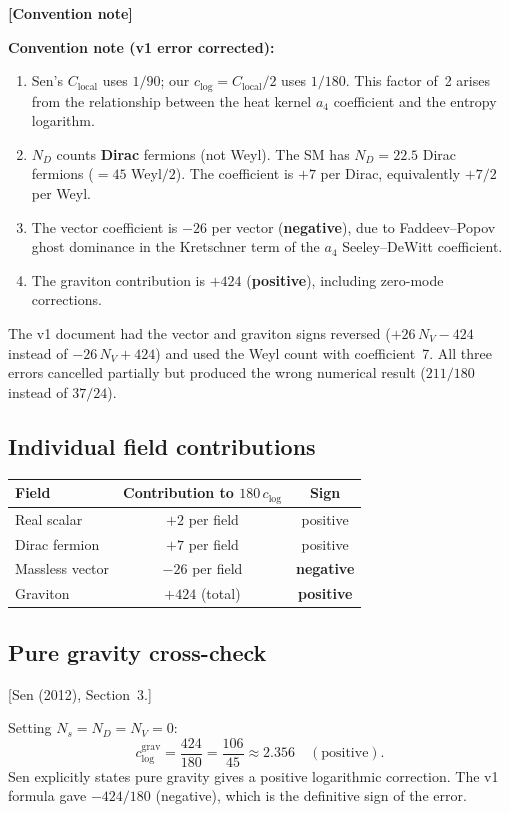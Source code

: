 \documentclass[12pt,a4paper]{article}
\theoremstyle{definition}
\theoremstyle{remark}
\newcommand{\fromlit}[1]{\textcolor{blue!70!black}{\textsf{[#1]}}}
\newcommand{\signcorrection}[1]{%
  \par\noindent\colorbox{red!10}{%
    \parbox{\dimexpr\linewidth-2\fboxsep}{%
      \textcolor{red!50!black}{\textbf{[Convention note]}}
      \textcolor{red!50!black}{#1}%
    }%
  }\par%
}
\begin{document}
\signcorrection{%
\textbf{Convention note (v1 error corrected):}
\begin{enumerate}[nosep]
\item Sen's $C_{\mathrm{local}}$ uses $1/90$; our $c_{\log} =
  C_{\mathrm{local}}/2$ uses $1/180$.  This factor of~2 arises
  from the relationship between the heat kernel $a_4$ coefficient
  and the entropy logarithm.
\item $N_D$ counts \textbf{Dirac} fermions (not Weyl).
  The SM has $N_D = 22.5$ Dirac fermions ($= 45$ Weyl$/2$).
  The coefficient is $+7$ per Dirac, equivalently $+7/2$ per Weyl.
\item The vector coefficient is $-26$ per vector (\textbf{negative}),
  due to Faddeev--Popov ghost dominance in the Kretschner term of
  the $a_4$ Seeley--DeWitt coefficient.
\item The graviton contribution is $+424$ (\textbf{positive}),
  including zero-mode corrections.
\end{enumerate}
The v1 document had the vector and graviton signs reversed
($+26\,N_V - 424$ instead of $-26\,N_V + 424$) and used the Weyl
count with coefficient~7.  All three errors cancelled partially but
produced the wrong numerical result ($211/180$ instead of $37/24$).}

\subsection{Individual field contributions}

\begin{center}
\begin{tabular}{lcc}
\toprule
Field & Contribution to $180\,c_{\log}$ & Sign \\
\midrule
Real scalar & $+2$ per field & positive \\
Dirac fermion & $+7$ per field & positive \\
Massless vector & $-26$ per field & \textbf{negative} \\
Graviton & $+424$ (total) & \textbf{positive} \\
\bottomrule
\end{tabular}
\end{center}

\subsection{Pure gravity cross-check}
\fromlit{Sen (2012), Section~3.}

Setting $N_s = N_D = N_V = 0$:
\begin{equation}
  c_{\log}^{\mathrm{grav}} = \frac{424}{180}
  = \frac{106}{45} \approx 2.356
  \quad (\text{positive}).
\end{equation}
Sen explicitly states pure gravity gives a positive logarithmic
correction.  The v1 formula gave $-424/180$ (negative), which is
the definitive sign of the error.
\end{document}
